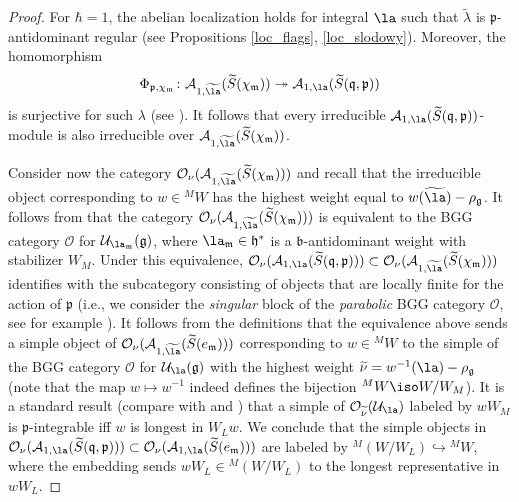 \documentclass[12pt]{amsart}
\newcommand{\CO}{\mathcal{O}}
\begin{document}
\begin{proof}
For $\hbar=1$, the abelian localization holds for integral $\la$ such that $\widetilde{\lambda}$ is  $\mathfrak{p}$-antidominant regular (see Propositions \ref{loc_flags}, \ref{loc_slodowy}). Moreover, the homomorphism 
\begin{equation*}
\Phi_{\mathfrak{p},\chi_{\mathfrak{m}}}\colon \mathcal{A}_{1,\widetilde{\la}}(\widetilde{S}(\chi_{\mathfrak{m}})) \twoheadrightarrow \mathcal{A}_{1,\la}(\widetilde{S}(\mathfrak{q},\mathfrak{p}))
\end{equation*}
is surjective for such $\lambda$ (see \cite[Theorem 3.8]{BoBr}). It follows that every irreducible $\mathcal{A}_{1,\la}(\widetilde{S}(\mathfrak{q},\mathfrak{p}))$-module is also irreducible over $\mathcal{A}_{1,\widetilde{\la}}(\widetilde{S}(\chi_{\mathfrak{m}}))$. 



Consider now the category $\CO_\nu(\mathcal{A}_{1,\widetilde{\la}}(\widetilde{S}(\chi_{\mathfrak{m}})))$ and recall that the irreducible object corresponding to $w \in {}^MW$ has the highest weight equal to $w(\widetilde{\la})-\rho_{\mathfrak{g}}$. It follows from \cite[Theorem 8]{w} that the category $\CO_\nu(\mathcal{A}_{1,\widetilde{\la}}(\widetilde{S}(\chi_{\mathfrak{m}})))$ is equivalent to the BGG category $\mathcal{O}$ for $\mathcal{U}_{\la_{\mathfrak{m}}}(\mathfrak{g})$, where $\la_{\mathfrak{m}} \in \mathfrak{h}^*$ is a $\mathfrak{b}$-antidominant weight with stabilizer $W_M$. Under this equivalence,
$\CO_\nu(\mathcal{A}_{1,\la}(\widetilde{S}(\mathfrak{q},\mathfrak{p}))) \subset \CO_\nu(\mathcal{A}_{1,\widetilde{\la}}(\widetilde{S}(\chi_{\mathfrak{m}})))$ identifies with the
subcategory consisting of objects that are locally finite for the action of $\mathfrak{p}$ (i.e., we consider the {\emph{singular}} block of the {\em{parabolic}} BGG category $\mathcal{O}$, see for example \cite[Section 9]{hum_bgg_O}).
It follows from the definitions that the equivalence above sends a simple object of $\CO_\nu(\mathcal{A}_{1,\widetilde{\la}}(\widetilde{S}(e_{\mathfrak{m}})))$ corresponding to $w \in {}^MW$ to the simple of the BGG category $\mathcal{O}$ for $\mathcal{U}_{\la}(\mathfrak{g})$ with the highest weight $\widetilde{\nu}=w^{-1}(\la) - \rho_{\mathfrak{g}}$ (note that the map $w \mapsto w^{-1}$ indeed defines the bijection ${}^MW \iso W/W_M$). It is a standard result (compare with \cite[Section 9.2]{hum_bgg_O} and \cite[Section 2]{gruber}) that a simple of $\mathcal{O}_{\widetilde{\nu}}(\mathcal{U}_\la)$ labeled by $wW_M$ is $\mathfrak{p}$-integrable iff $w$ is longest in $W_Lw$. We conclude that the simple objects in $\CO_\nu(\mathcal{A}_{1,\la}(\widetilde{S}(\mathfrak{q},\mathfrak{p}))) \subset \CO_\nu(\mathcal{A}_{1,\la}(\widetilde{S}(e_{\mathfrak{m}})))$ are labeled by ${}^M(W/W_L) \hookrightarrow {}^MW$, where the embedding sends $wW_L \in {}^M(W/W_L)$ to the longest representative in $wW_L$.





\end{proof}
\end{document}
